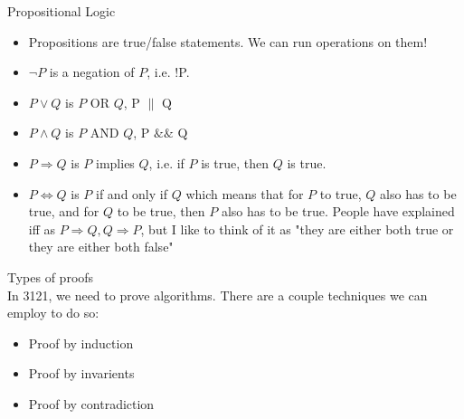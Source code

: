 \documentclass[journal, letterpaper]{IEEEtran}
\begin{document}
\begin{example}{Propositional Logic}\\
    \begin{itemize}
        \item Propositions are true/false statements. We can run operations on them!
        \item $\neg P$ is a negation of $P$, i.e. !P.
        \item $P \lor Q$ is $P$ OR $Q$, P $\|$ Q
        \item $P \land Q$ is $P$ AND $Q$, P $\&\&$ Q
        \item $P \Rightarrow Q$ is $P$ implies $Q$, i.e. if $P$ is true, then $Q$ is true. 
        \item $P \iff Q$ is $P$ if and only if $Q$ which means that for $P$ to true, $Q$
            also has to be true, and for $Q$ to be true, then $P$ also has to be true.
            People have explained iff as $P \Rightarrow Q, Q \Rightarrow P$, but I like to
            think of it as "they are either both true or they are either both false"
    \end{itemize}
\end{example}

\begin{example}{Types of proofs}\\
    In 3121, we need to prove algorithms. There are a couple techniques we can employ to
    do so:
    \begin{itemize}
        \item Proof by induction
        \item Proof by invarients
        \item Proof by contradiction
    \end{itemize}
\end{example}
\end{document}
